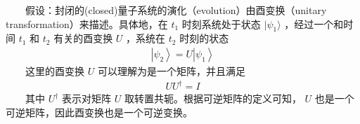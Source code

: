 \documentclass[a4paper,11pt,english]{sphinxmanual}
\begin{document}
\sphinxAtStartPar
  假设：封闭的(closed)量子系统的演化（evolution）由酉变换（unitary transformation）来描述。具体地，在 \(t_1\) 时刻系统处于状态 \(|\psi_1 \rangle\) ，经过一个和时间 \(t_1\) 和  \(t_2\) 有关的酉变换  \(U\) ，系统在  \(t_2\) 时刻的状态
\begin{equation*}
\begin{split}\left|\psi_{2}\right\rangle=U\left|\psi_{1}\right\rangle\end{split}
\end{equation*}
\sphinxAtStartPar
  这里的酉变换 \(U\) 可以理解为是一个矩阵，并且满足
\begin{equation*}
\begin{split}U U^{\dagger}=I\end{split}
\end{equation*}
\sphinxAtStartPar
  其中 \(U^{\dagger}\) 表示对矩阵 \(U\) 取转置共轭。根据可逆矩阵的定义可知， \(U\) 也是一个可逆矩阵，因此酉变换也是一个可逆变换。
\end{document}
